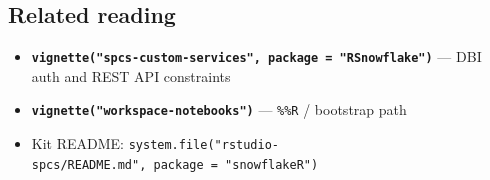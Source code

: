 \documentclass[
]{article}
\providecommand{\tightlist}{%
  \setlength{\itemsep}{0pt}\setlength{\parskip}{0pt}}
\begin{document}
\subsection{Related reading}\label{related-reading}

\begin{itemize}
\tightlist
\item
  \textbf{\texttt{vignette("spcs-custom-services",\ package\ =\ "RSnowflake")}}
  --- DBI auth and REST API constraints
\item
  \textbf{\texttt{vignette("workspace-notebooks")}} --- \texttt{\%\%R} /
  bootstrap path
\item
  Kit README:
  \texttt{system.file("rstudio-spcs/README.md",\ package\ =\ "snowflakeR")}
\end{itemize}
\end{document}
